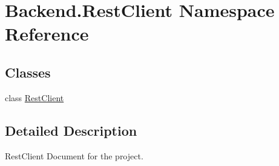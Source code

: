 \hypertarget{namespace_backend_1_1_rest_client}{}\section{Backend.\+Rest\+Client Namespace Reference}
\label{namespace_backend_1_1_rest_client}
\subsection*{Classes}
\begin{DoxyCompactItemize}
\item 
class \hyperlink{class_backend_1_1_rest_client_1_1_rest_client}{Rest\+Client}
\end{DoxyCompactItemize}


\subsection{Detailed Description}
\begin{DoxyVerb}RestClient Document
    for the project.
\end{DoxyVerb}
 
